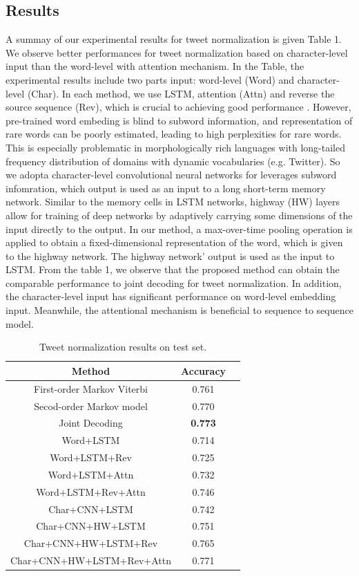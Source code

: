 \documentclass[letterpaper]{article}
\begin{document}
\subsection{Results}
A summay of our experimental results for tweet normalization is given Table 1. We observe better performances for tweet normalization based on character-level input than the word-level with attention mechanism. In the Table, the experimental results include two parts input: word-level (Word) and character-level (Char). In each method, we use LSTM, attention (Attn) and reverse the source sequence (Rev), which is crucial to achieving good performance \cite{Sutskever:2014:SSL:2969033.2969173}. However, pre-trained word embeding is blind to subword information, and representation of rare words can be poorly estimated, leading to high perplexities for rare words. This is especially problematic in morphologically rich languages with long-tailed frequency distribution of domains with dynamic vocabularies (e.g. Twitter). So we adopta character-level convolutional neural networks for leverages subword infomration, which output is used as an input to a long short-term memory network. Similar to the memory cells in LSTM networks, highway (HW) layers allow for training of deep networks by adaptively carrying some dimensions of the input directly to the output. In our method, a max-over-time pooling operation is applied to obtain a fixed-dimensional representation of the word, which is given to the highway network. The highway network' output is used as the input to LSTM. From the table 1, we observe that the proposed method can obtain the comparable performance to joint decoding for tweet normalization. In addition, the character-level input has significant performance on word-level embedding input. Meanwhile, the attentional mechanism is beneficial to sequence to sequence model.
\begin{table}
	\begin{center}
		\begin{tabular}{| c | c | c | }
			\hline
			\bf Method & \bf Accuracy \\ \hline
			First-order Markov Viterbi & 0.761 \\ \hline
			Secod-order Markov model & 0.770 \\ \hline
			Joint Decoding & \textbf{0.773} \\ \hline
			Word+LSTM & 0.714 \\ \hline
			Word+LSTM+Rev & 0.725   \\ 
			\hline
			Word+LSTM+Attn & 0.732   \\ 
			\hline
			Word+LSTM+Rev+Attn & 0.746   \\ 
			\hline
			Char+CNN+LSTM & 0.742   \\ 
			\hline
			Char+CNN+HW+LSTM & 0.751   \\ 
			\hline
			Char+CNN+HW+LSTM+Rev & 0.765   \\ 
			\hline
			Char+CNN+HW+LSTM+Rev+Attn & 0.771 \\ 
			\hline
		\end{tabular}
		\caption{Tweet normalization results on test set.}
	\end{center}
\end{table}
\end{document}
